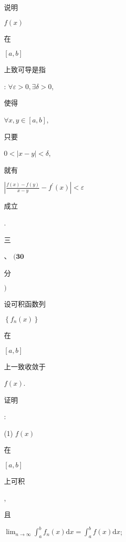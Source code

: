 \documentclass[10pt]{article}
\begin{document}
\begin{CJK}{UTF8}{mj}说明\end{CJK} $f(x)$ \begin{CJK}{UTF8}{mj}在\end{CJK} $[a, b]$ \begin{CJK}{UTF8}{mj}上致可导是指\end{CJK}: $\forall \varepsilon>0, \exists \delta>0$, \begin{CJK}{UTF8}{mj}使得\end{CJK} $\forall x, y \in[a, b]$, \begin{CJK}{UTF8}{mj}只要\end{CJK} $0<|x-y|<\delta$, \begin{CJK}{UTF8}{mj}就有\end{CJK} $\left|\frac{f(x)-f(y)}{x-y}-f^{\prime}(x)\right|<\varepsilon$ \begin{CJK}{UTF8}{mj}成立\end{CJK}.

\begin{CJK}{UTF8}{mj}三\end{CJK}、 $(\mathbf{3 0}$ \begin{CJK}{UTF8}{mj}分\end{CJK} $)$ \begin{CJK}{UTF8}{mj}设可积函数列\end{CJK} $\left\{f_{n}(x)\right\}$ \begin{CJK}{UTF8}{mj}在\end{CJK} $[a, b]$ \begin{CJK}{UTF8}{mj}上一致收敛于\end{CJK} $f(x)$. \begin{CJK}{UTF8}{mj}证明\end{CJK}:

(1) $f(x)$ \begin{CJK}{UTF8}{mj}在\end{CJK} $[a, b]$ \begin{CJK}{UTF8}{mj}上可积\end{CJK}, \begin{CJK}{UTF8}{mj}且\end{CJK} $\lim _{n \rightarrow \infty} \int_{a}^{b} f_{n}(x) \mathrm{d} x=\int_{a}^{b} f(x) \mathrm{d} x$;
\end{document}
